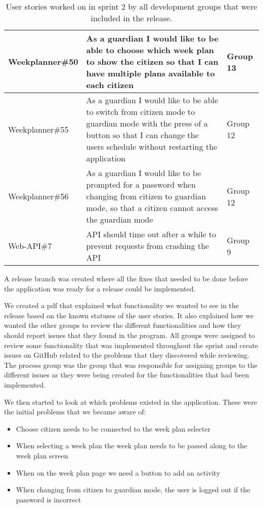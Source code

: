 \begin{table}[H]
\begin{tabular}{|p{2.8cm}|p{7cm}|p{2cm}|}
    Weekplanner\#50 & As a guardian I would like to be able to choose which week plan to show the citizen so that I can have multiple plans available to each citizen                                          & Group 13            \\ \hline
    Weekplanner\#55 & As a guardian I would like to be able to switch from citizen mode to guardian mode with the press of a button so that I can change the users schedule without restarting the application & Group 12            \\ \hline
    Weekplanner\#56 & As a guardian I would like to be prompted for a password when changing from citizen to guardian mode, so that a citizen cannot access the guardian mode                                  & Group 12            \\ \hline
    Web-API\#7      & API should time out after a while to prevent requests from crashing the API                                                                                                              & Group 9             \\ \hline
    \end{tabular}
    \caption{User stories worked on in sprint 2 by all development groups that were included in the release.}\label{table:user-stories-sprint-2-release}
\end{table}

\noindent A release branch was created where all the fixes that needed to be done before the application was ready for a release could be implemented.

\noindent We created a pdf that explained what functionality we wanted to see in the release based on the known statuses of the user stories.
It also explained how we wanted the other groups to review the different functionalities and how they should report issues that they found in the program.
All groups were assigned to review some functionality that was implemented throughout the sprint and create issues on GitHub related to the problems that they discovered while reviewing. 
The process group was the group that was responsible for assigning groups to the different issues as they were being created for the functionalities that had been implemented. 

\noindent We then started to look at which problems existed in the application.
These were the initial problems that we became aware of:
\begin{itemize}
    \item Choose citizen needs to be connected to the week plan selecter
    \item When selecting a week plan the week plan needs to be passed along to the week plan screen
    \item When on the week plan page we need a button to add an activity
    \item When changing from citizen to guardian mode, the user is logged out if the password is incorrect
\end{itemize}

